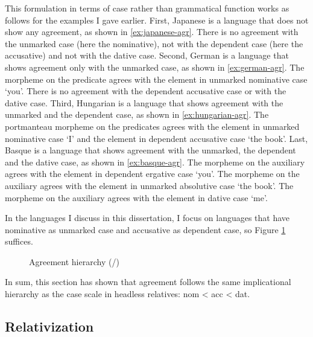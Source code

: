 This formulation in terms of case rather than grammatical function works as follows for the examples I gave earlier.
First, Japanese is a language that does not show any agreement, as shown in \ref{ex:japanese-agr}. There is no agreement with the unmarked case (here the nominative), not with the dependent case (here the accusative) and not with the dative case.
Second, German is a language that shows agreement only with the unmarked case, as shown in \ref{ex:german-agr}. The morpheme  on the predicate agrees with the element in unmarked nominative case  `you'. There is no agreement with the dependent accusative case or with the dative case.
Third, Hungarian is a language that shows agreement with the unmarked and the dependent case, as shown in \ref{ex:hungarian-agr}. The portmanteau morpheme  on the predicates agrees with the element in unmarked nominative case  `I' and the element in dependent accusative case  `the book'.
Last, Basque is a language that shows agreement with the unmarked, the dependent and the dative case, as shown in \ref{ex:basque-agr}. The morpheme  on the auxiliary agrees with the element in dependent ergative case  `you'. The morpheme  on the auxiliary agrees with the element in unmarked absolutive case  `the book'. The morpheme  on the auxiliary agrees with the element in dative case  `me'.

In the languages I discuss in this dissertation, I focus on languages that have nominative as unmarked case and accusative as dependent case, so Figure \ref{fig:agr-nom-acc-dat} suffices.

\begin{figure}[H]
  \centering
  \caption{Agreement hierarchy (/)}
  \label{fig:agr-nom-acc-dat}
\end{figure}

In sum, this section has shown that agreement follows the same implicational hierarchy as the case scale in headless relatives: \ac{nom} < \ac{acc} < \ac{dat}.


\subsection{Relativization}

